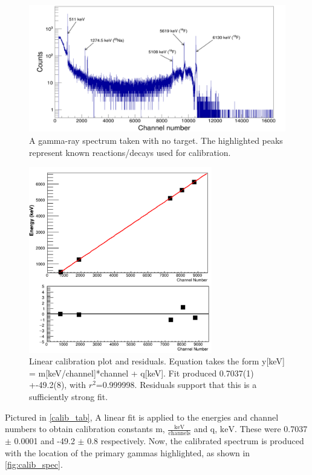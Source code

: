 \documentclass[a4paper,12pt]{article}
\begin{document}
\begin{figure}[h!]
    \centering
    \hspace*{-1.5cm}
    \includegraphics[width=18cm]{uncalib_spec.png}
    \caption{A gamma-ray spectrum taken with no target.  The highlighted peaks represent known reactions/decays used for calibration.}
    \label{fig:uncalib}
\end{figure}

\begin{figure}[H]
    \centering
    \includegraphics[width=8cm]{calib_fit.png}
    \caption{Linear calibration plot and residuals. Equation takes the form y[keV] = m[keV/channel]*channel + q[keV].  Fit produced 0.7037(1) +-49.2(8), with $r^2$=0.999998.  Residuals support that this is a sufficiently strong fit.}
    \label{fig:calib_fit}
\end{figure}

Pictured in \ref{calib_tab}, A linear fit is applied to the energies and channel numbers to obtain calibration constants m, $\frac{\text{keV}}{\text{channels}}$ and q, ${\text{keV}}$.  These were 0.7037 $\pm$ 0.0001 and -49.2 $\pm$ 0.8 respectively.  Now, the calibrated spectrum is produced with the location of the primary gammas highlighted, as shown in \ref{fig:calib_spec}.
\end{document}
